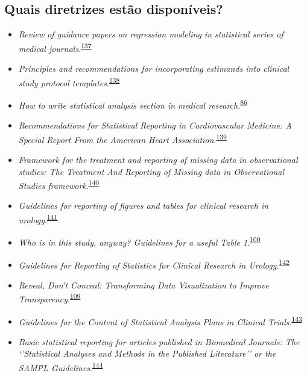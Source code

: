 \documentclass[
]{book}
\begin{document}
\hypertarget{quais-diretrizes-estuxe3o-disponuxedveis}{%
\subsection{Quais diretrizes estão disponíveis?}\label{quais-diretrizes-estuxe3o-disponuxedveis}}

\begin{itemize}
\item
  \emph{Review of guidance papers on regression modeling in statistical series of medical journals}.\textsuperscript{\protect\hyperlink{ref-Wallisch2022}{137}}
\item
  \emph{Principles and recommendations for incorporating estimands into clinical study protocol templates}.\textsuperscript{\protect\hyperlink{ref-Lynggaard2022}{138}}
\item
  \emph{How to write statistical analysis section in medical research}.\textsuperscript{\protect\hyperlink{ref-Dwivedi2022}{86}}
\item
  \emph{Recommendations for Statistical Reporting in Cardiovascular Medicine: A Special Report From the American Heart Association}.\textsuperscript{\protect\hyperlink{ref-Althouse2021}{139}}
\item
  \emph{Framework for the treatment and reporting of missing data in observational studies: The Treatment And Reporting of Missing data in Observational Studies framework}.\textsuperscript{\protect\hyperlink{ref-Lee2021}{140}}
\item
  \emph{Guidelines for reporting of figures and tables for clinical research in urology}.\textsuperscript{\protect\hyperlink{ref-Vickers2020}{141}}
\item
  \emph{Who is in this study, anyway? Guidelines for a useful Table 1}.\textsuperscript{\protect\hyperlink{ref-Hayes-Larson2019}{100}}
\item
  \emph{Guidelines for Reporting of Statistics for Clinical Research in Urology}.\textsuperscript{\protect\hyperlink{ref-assel2019}{142}}
\item
  \emph{Reveal, Don't Conceal: Transforming Data Visualization to Improve Transparency}.\textsuperscript{\protect\hyperlink{ref-Weissgerber2019}{109}}
\item
  \emph{Guidelines for the Content of Statistical Analysis Plans in Clinical Trials}.\textsuperscript{\protect\hyperlink{ref-Gamble2017}{143}}
\item
  \emph{Basic statistical reporting for articles published in Biomedical Journals: The `'Statistical Analyses and Methods in the Published Literature'' or the SAMPL Guidelines}.\textsuperscript{\protect\hyperlink{ref-Lang2015}{144}}

\end{itemize}
\end{document}
